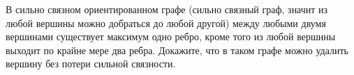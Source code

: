 В сильно связном ориентированном графе (сильно связный граф, значит из любой вершины можно добраться до любой другой) между
любыми двумя вершинами существует максимум одно ребро, кроме того из любой вершины выходит по крайне мере два
ребра. Докажите, что в таком графе можно удалить вершину без потери сильной связности.